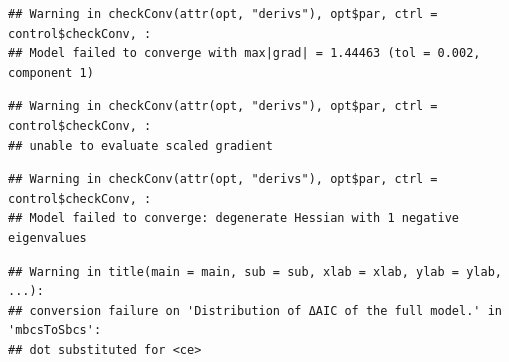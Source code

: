 \documentclass[
]{article}
\newenvironment{Shaded}{\begin{snugshade}}{\end{snugshade}}
\newcommand{\AttributeTok}[1]{\textcolor[rgb]{0.77,0.63,0.00}{#1}}
\newcommand{\CommentTok}[1]{\textcolor[rgb]{0.56,0.35,0.01}{\textit{#1}}}
\newcommand{\FunctionTok}[1]{\textcolor[rgb]{0.00,0.00,0.00}{#1}}
\newcommand{\NormalTok}[1]{#1}
\newcommand{\OtherTok}[1]{\textcolor[rgb]{0.56,0.35,0.01}{#1}}
\newcommand{\SpecialCharTok}[1]{\textcolor[rgb]{0.00,0.00,0.00}{#1}}
\newcommand{\StringTok}[1]{\textcolor[rgb]{0.31,0.60,0.02}{#1}}
\begin{document}
\begin{Shaded}
\end{Shaded}

\begin{verbatim}
## Warning in checkConv(attr(opt, "derivs"), opt$par, ctrl = control$checkConv, :
## Model failed to converge with max|grad| = 1.44463 (tol = 0.002, component 1)
\end{verbatim}

\begin{verbatim}
## Warning in checkConv(attr(opt, "derivs"), opt$par, ctrl = control$checkConv, :
## unable to evaluate scaled gradient
\end{verbatim}

\begin{verbatim}
## Warning in checkConv(attr(opt, "derivs"), opt$par, ctrl = control$checkConv, :
## Model failed to converge: degenerate Hessian with 1 negative eigenvalues
\end{verbatim}

\begin{Shaded}
\end{Shaded}

\begin{verbatim}
## Warning in title(main = main, sub = sub, xlab = xlab, ylab = ylab, ...):
## conversion failure on 'Distribution of ΔAIC of the full model.' in 'mbcsToSbcs':
## dot substituted for <ce>
\end{verbatim}
\end{document}
